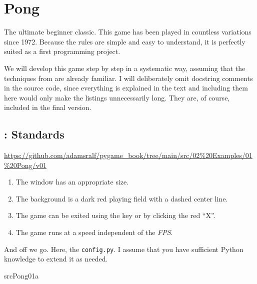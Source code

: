 \section{Pong}

The ultimate beginner classic. This game has been played in countless variations since 1972.  Because the rules are simple and easy to understand, it is perfectly suited as a first programming project.

We will develop this game step by step in a systematic way, assuming that the techniques from  are already familiar. I will deliberately omit docstring comments in the source code, since everything is explained in the text and including them here would only make the listings unnecessarily long.  They are, of course, included in the final version.



\subsection{: Standards}
\begin{diskbox}
	\url{https://github.com/adamsralf/pygame_book/tree/main/src/02%20Examples/01%20Pong/v01}
\end{diskbox}
\begin{enumerate}
	\item The window has an appropriate size.\label{req0201StandardGröße}
	\item The background is a dark red playing field with a dashed center line.\label{req0201StandardHintergrund}
	\item The game can be exited using the \keys{\esc} key or by clicking the red ``X''.\label{req0201StandardBeenden}
	\item The game runs at a speed independent of the \emph{FPS}.\label{req0201StandardFps}
\end{enumerate}
\er

And off we go. Here, the \texttt{config.py}. I assume that you have sufficient Python knowledge to extend it as needed.

{srcPong01a}


